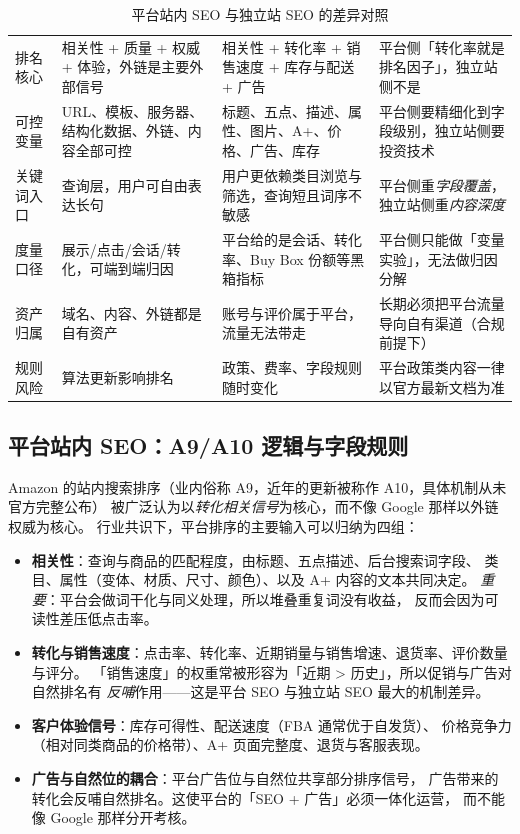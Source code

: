 \begin{table}[htbp]
\centering
\caption{平台站内 SEO 与独立站 SEO 的差异对照}
\label{tab:platformvs}
\small
\begin{tabularx}{\textwidth}{L{2.2cm} L{3.3cm} L{3.3cm} Y}
\toprule
{} &  &  &  \\
\midrule
排名核心 & 相关性 + 质量 + 权威 + 体验，外链是主要外部信号 & 相关性 + 转化率 + 销售速度 + 库存与配送 + 广告 & 平台侧「转化率就是排名因子」，独立站侧不是 \\
可控变量 & URL、模板、服务器、结构化数据、外链、内容全部可控 & 标题、五点、描述、属性、图片、A+、价格、广告、库存 & 平台侧要精细化到字段级别，独立站侧要投资技术 \\
关键词入口 & 查询层，用户可自由表达长句 & 用户更依赖类目浏览与筛选，查询短且词序不敏感 & 平台侧重\emph{字段覆盖}，独立站侧重\emph{内容深度} \\
度量口径 & 展示/点击/会话/转化，可端到端归因 & 平台给的是会话、转化率、Buy Box 份额等黑箱指标 & 平台侧只能做「变量实验」，无法做归因分解 \\
资产归属 & 域名、内容、外链都是自有资产 & 账号与评价属于平台，流量无法带走 & 长期必须把平台流量导向自有渠道（合规前提下） \\
规则风险 & 算法更新影响排名 & 政策、费率、字段规则随时变化 & 平台政策类内容一律以官方最新文档为准 \\
\bottomrule
\end{tabularx}
\end{table}

\subsection{平台站内 SEO：A9/A10 逻辑与字段规则}

Amazon 的站内搜索排序（业内俗称 A9，近年的更新被称作 A10，具体机制从未官方完整公布）
被广泛认为以\emph{转化相关信号}为核心，而不像 Google 那样以外链权威为核心。
行业共识下，平台排序的主要输入可以归纳为四组：

\begin{itemize}
  \item \textbf{相关性}：查询与商品的匹配程度，由标题、五点描述、后台搜索词字段、
        类目、属性（变体、材质、尺寸、颜色）、以及 A+ 内容的文本共同决定。
        \emph{重要}：平台会做词干化与同义处理，所以堆叠重复词没有收益，
        反而会因为可读性差压低点击率。
  \item \textbf{转化与销售速度}：点击率、转化率、近期销量与销售增速、退货率、评价数量与评分。
        「销售速度」的权重常被形容为「近期 > 历史」，所以促销与广告对自然排名有
        \emph{反哺}作用——这是平台 SEO 与独立站 SEO 最大的机制差异。
  \item \textbf{客户体验信号}：库存可得性、配送速度（FBA 通常优于自发货）、
        价格竞争力（相对同类商品的价格带）、A+ 页面完整度、退货与客服表现。
  \item \textbf{广告与自然位的耦合}：平台广告位与自然位共享部分排序信号，
        广告带来的转化会反哺自然排名。这使平台的「SEO + 广告」必须一体化运营，
        而不能像 Google 那样分开考核。
\end{itemize}

